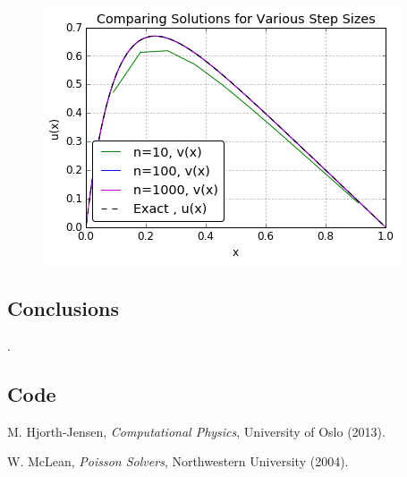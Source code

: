 \documentclass[11pt]{article}
\begin{document}
    \begin{figure}[h] \begin{center}
    \includegraphics{setpsizechange.png}
    \end{center}  \end{figure}

\subsection{Conclusions}

    .

\subsection{Code}

    

    

\begin{thebibliography}{1}

     M. Hjorth-Jensen, {\em Computational Physics}, University of Oslo (2013).

     W. McLean, {\em Poisson Solvers}, Northwestern University (2004).

\end{thebibliography}
\end{document}
